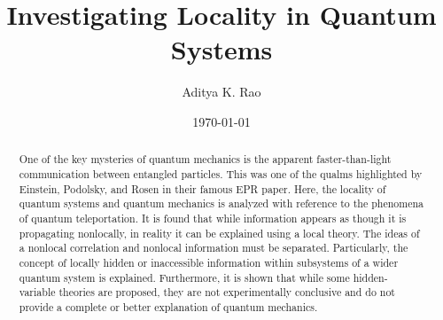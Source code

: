 \documentclass[%
 aip,
cp,  %
 amsmath,amssymb,%
 reprint,%
]{revtex4-2}
\begin{document}
\title{Investigating Locality in Quantum Systems}%

\author{Aditya K. Rao} %


\date{\today} %

\begin{abstract}
    One of the key mysteries of quantum mechanics is the apparent faster-than-light communication between entangled particles. This was one of the qualms highlighted by Einstein, Podolsky, and Rosen in their famous EPR paper. Here, the locality of quantum systems and quantum mechanics is analyzed with reference to the phenomena of quantum teleportation. It is found that while information appears as though it is propagating nonlocally, in reality it can be explained using a local theory. The ideas of a nonlocal correlation and nonlocal information must be separated. Particularly, the concept of locally hidden or inaccessible information within subsystems of a wider quantum system is explained. Furthermore, it is shown that while some hidden-variable theories are proposed, they are not experimentally conclusive and do not provide a complete or better explanation of quantum mechanics.
\end{abstract}

\maketitle
\end{document}
